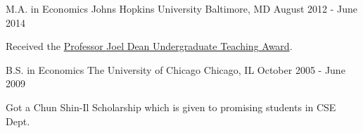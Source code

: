 


\begin{cventries}


\cventry
{M.A. in Economics} %
{Johns Hopkins University} %
{Baltimore, MD} %
{August 2012 - June 2014} %
{ %
	\begin{cvitems}
		\item {Received the \href{https://econ.jhu.edu/wp-content/uploads/sites/27/2011/06/JHUEconNewsletter_2014.pdf}{Professor Joel Dean Undergraduate Teaching Award}.}
	\end{cvitems}
}

\cventry
{B.S. in Economics} %
{The University of Chicago} %
{Chicago, IL} %
{October 2005 - June 2009} %
{ %
\begin{cvitems}
\item {Got a Chun Shin-Il Scholarship which is given to promising students in CSE Dept.}
\end{cvitems}
}


\end{cventries}